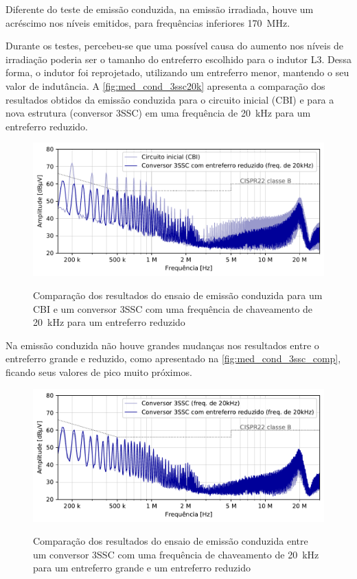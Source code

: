     Diferente do teste de emissão conduzida, na emissão irradiada, houve um acréscimo nos níveis emitidos, para frequências inferiores \SI{170}{\mega\hertz}. 
    
    Durante os testes, percebeu-se que uma possível causa do aumento nos níveis de irradiação poderia ser o tamanho do entreferro escolhido para o indutor L3. Dessa forma, o indutor foi reprojetado, utilizando um entreferro menor, mantendo o seu valor de indutância. A \autoref{fig:med_cond_3ssc20k} apresenta a comparação dos resultados obtidos da emissão conduzida para o circuito inicial (CBI) e para a nova estrutura (conversor 3SSC) em uma frequência de \SI{20}{\kilo\hertz} para um entreferro reduzido.
    
    \begin{figure}[H]
    	\centering
    	\caption{Comparação dos resultados do ensaio de emissão conduzida para um CBI e um conversor 3SSC com uma frequência de chaveamento de \SI{20}{\kilo\hertz} para um entreferro reduzido}
    	\includegraphics[scale=.9]{pdf/cond/Conversor 3SSC com entreferro reduzido (freq. de 20kHz).pdf}
    	\label{fig:med_cond_3ssc20k}
    \end{figure}
    
    Na emissão conduzida não houve grandes mudanças nos resultados entre o entreferro grande e reduzido, como apresentado na \autoref{fig:med_cond_3ssc_comp}, ficando seus valores de pico muito próximos.
    
    \begin{figure}[H]
    	\centering
    	\caption{Comparação dos resultados do ensaio de emissão conduzida entre um conversor 3SSC com uma frequência de chaveamento de \SI{20}{\kilo\hertz} para um entreferro grande e um entreferro reduzido}
    	\includegraphics[scale=.9]{pdf/cond/cond-Conversor 3SSC (freq. de 20kHz)-Conversor 3SSC com entreferro reduzido (freq. de 20kHz).pdf}
    	\label{fig:med_cond_3ssc_comp}
    \end{figure}
    
